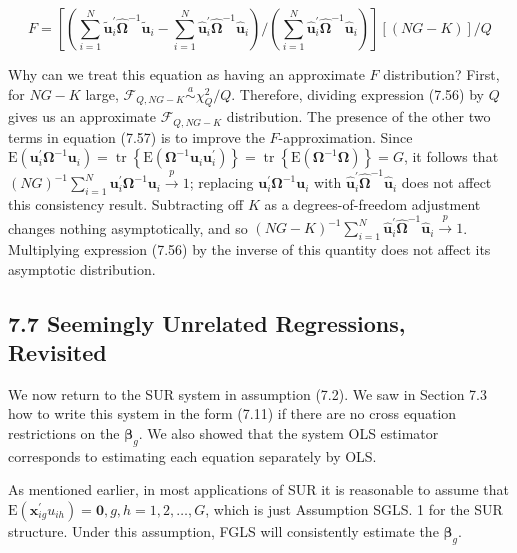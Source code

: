 \documentclass[10pt]{article}
\begin{document}
\begin{equation*}
F=\left[\left(\sum_{i=1}^{N} \tilde{\mathbf{u}}_{i}^{\prime} \hat{\boldsymbol{\Omega}}^{-1} \tilde{\mathbf{u}}_{i}-\sum_{i=1}^{N} \hat{\mathbf{u}}_{i}^{\prime} \hat{\boldsymbol{\Omega}}^{-1} \hat{\mathbf{u}}_{i}\right) /\left(\sum_{i=1}^{N} \hat{\mathbf{u}}_{i}^{\prime} \hat{\boldsymbol{\Omega}}^{-1} \hat{\mathbf{u}}_{i}\right)\right][(N G-K)] / Q \tag{7.57}
\end{equation*}


Why can we treat this equation as having an approximate $F$ distribution? First, for $N G-K$ large, $\mathscr{F}_{Q, N G-K} \stackrel{a}{\sim} \chi_{Q}^{2} / Q$. Therefore, dividing expression (7.56) by $Q$ gives us an approximate $\mathscr{F}_{Q, N G-K}$ distribution. The presence of the other two terms in equation (7.57) is to improve the $F$-approximation. Since $\mathrm{E}\left(\mathbf{u}_{i}^{\prime} \boldsymbol{\Omega}^{-1} \mathbf{u}_{i}\right)= \operatorname{tr}\left\{\mathrm{E}\left(\boldsymbol{\Omega}^{-1} \mathbf{u}_{i} \mathbf{u}_{i}^{\prime}\right)\right\}=\operatorname{tr}\left\{\mathrm{E}\left(\boldsymbol{\Omega}^{-1} \boldsymbol{\Omega}\right)\right\}=G$, it follows that $(N G)^{-1} \sum_{i=1}^{N} \mathbf{u}_{i}^{\prime} \boldsymbol{\Omega}^{-1} \mathbf{u}_{i} \xrightarrow{p} 1$; replacing $\mathbf{u}_{i}^{\prime} \boldsymbol{\Omega}^{-1} \mathbf{u}_{i}$ with $\hat{\mathbf{u}}_{i}^{\prime} \hat{\boldsymbol{\Omega}}^{-1} \hat{\mathbf{u}}_{i}$ does not affect this consistency result. Subtracting off $K$ as a degrees-of-freedom adjustment changes nothing asymptotically, and so $(N G-K)^{-1} \sum_{i=1}^{N} \hat{\mathbf{u}}_{i}^{\prime} \hat{\boldsymbol{\Omega}}^{-1} \hat{\mathbf{u}}_{i} \xrightarrow{p} 1$. Multiplying expression (7.56) by the inverse of this quantity does not affect its asymptotic distribution.

\subsection*{7.7 Seemingly Unrelated Regressions, Revisited}
We now return to the SUR system in assumption (7.2). We saw in Section 7.3 how to write this system in the form (7.11) if there are no cross equation restrictions on the $\boldsymbol{\beta}_{g}$. We also showed that the system OLS estimator corresponds to estimating each equation separately by OLS.

As mentioned earlier, in most applications of SUR it is reasonable to assume that $\mathrm{E}\left(\mathbf{x}_{i g}^{\prime} u_{i h}\right)=\mathbf{0}, g, h=1,2, \ldots, G$, which is just Assumption SGLS. 1 for the SUR structure. Under this assumption, FGLS will consistently estimate the $\boldsymbol{\beta}_{g}$.
\end{document}

